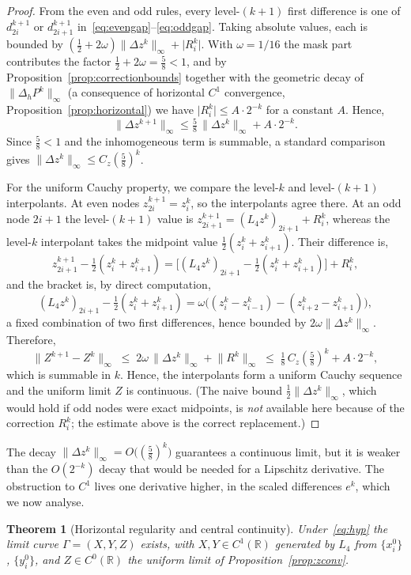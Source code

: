 \documentclass{article}
\theoremstyle{plain}
\newtheorem{theorem}{Theorem}[section]
\theoremstyle{definition}
\newcommand{\R}{\mathbb{R}}
\newcommand{\Lop}{L_4}
\newcommand{\norm}[1]{\lVert #1 \rVert}
\newcommand{\abs}[1]{\lvert #1 \rvert}
\newcommand{\Dh}{\Delta_h}
\begin{document}
\begin{proof}
From the even and odd rules, every level-$(k+1)$ first difference is one of
$d_{2i}^{k+1}$ or $d_{2i+1}^{k+1}$ in~\eqref{eq:evengap}--\eqref{eq:oddgap}.
Taking absolute values, each is bounded by
$(\tfrac12+2\omega)\norm{\Delta z^k}_\infty+\abs{R_i^k}$. With $\omega=1/16$
the mask part contributes the factor $\tfrac12+2\omega=\tfrac58<1$, and by
Proposition~\ref{prop:correctionbounds} together with the geometric decay of
$\norm{\Dh P^k}_\infty$ (a consequence of horizontal $C^1$ convergence,
Proposition~\ref{prop:horizontal}) we have $\abs{R_i^k}\leq A\cdot 2^{-k}$ for a
constant $A$. Hence,
\[
  \norm{\Delta z^{k+1}}_\infty
  \leq \tfrac58\,\norm{\Delta z^k}_\infty + A\cdot 2^{-k}.
\]
Since $\tfrac58<1$ and the inhomogeneous term is summable, a standard comparison
gives $\norm{\Delta z^k}_\infty\leq C_z(\tfrac58)^k$.

For the uniform Cauchy property, we compare the level-$k$ and level-$(k+1)$
interpolants. At even nodes $z_{2i}^{k+1}=z_i^k$, so the interpolants agree
there. At an odd node $2i+1$ the level-$(k+1)$ value is
$z_{2i+1}^{k+1}=(\Lop z^k)_{2i+1}+R_i^k$, whereas the level-$k$ interpolant
takes the midpoint value $\tfrac12(z_i^k+z_{i+1}^k)$. Their difference is,
\[
  z_{2i+1}^{k+1}-\tfrac12(z_i^k+z_{i+1}^k)
  = \bigl[(\Lop z^k)_{2i+1}-\tfrac12(z_i^k+z_{i+1}^k)\bigr] + R_i^k,
\]
and the bracket is, by direct computation,
\[
  (\Lop z^k)_{2i+1}-\tfrac12(z_i^k+z_{i+1}^k)
  = \omega\bigl((z_i^k-z_{i-1}^k)-(z_{i+2}^k-z_{i+1}^k)\bigr),
\]
a fixed combination of two first differences, hence bounded by
$2\omega\norm{\Delta z^k}_\infty$. Therefore,
\[
  \norm{Z^{k+1}-Z^k}_\infty
  \;\leq\; 2\omega\,\norm{\Delta z^k}_\infty + \norm{R^k}_\infty
  \;\leq\; \tfrac18\,C_z(\tfrac58)^k + A\cdot 2^{-k},
\]
which is summable in $k$. Hence, the interpolants form a uniform Cauchy sequence
and the uniform limit $Z$ is continuous. (The naive bound
$\tfrac12\norm{\Delta z^k}_\infty$, which would hold if odd nodes were exact
midpoints, is \emph{not} available here because of the correction $R_i^k$; the
estimate above is the correct replacement.)
\end{proof}

The decay $\norm{\Delta z^k}_\infty=O\bigl((\tfrac58)^k\bigr)$ guarantees a
continuous limit, but it is weaker than the $O(2^{-k})$ decay that would be
needed for a Lipschitz derivative. The obstruction to $C^1$ lives one
derivative higher, in the scaled differences $e^k$, which we now analyse.

\begin{theorem}[Horizontal regularity and central continuity]\label{thm:cont}
Under~\eqref{eq:hyp} the limit curve $\Gamma=(X,Y,Z)$ exists, with
$X,Y\in C^1(\R)$ generated by $\Lop$ from $\{x_i^0\}$, $\{y_i^0\}$, and
$Z\in C^0(\R)$ the uniform limit of Proposition~\ref{prop:zconv}.
\end{theorem}
\end{document}
